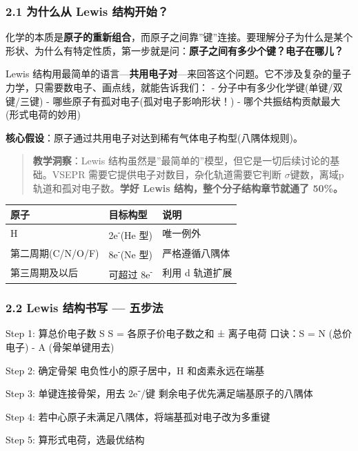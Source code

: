 \documentclass[a4paper,11pt]{ctexart}
\newenvironment{Shaded}{}{}
\newenvironment{Highlighting}{}{}
\newcommand{\NormalTok}[1]{#1}
\newcounter{none}
\newcommand{\箭}{\ensuremath{\rightarrow}}
\newcommand{\左箭}{\ensuremath{\leftarrow}}
\newcommand{\上箭}{\ensuremath{\uparrow}}
\newcommand{\下箭}{\ensuremath{\downarrow}}
\newcommand{\衡}{\ensuremath{\rightleftharpoons}}
\newcommand{\双箭}{\ensuremath{\leftrightarrow}}
\newcommand{\约等于}{\ensuremath{\approx}}
\newcommand{\小于等于}{\ensuremath{\leq}}
\newcommand{\大于等于}{\ensuremath{\geq}}
\newcommand{\不等于}{\ensuremath{\neq}}
\newcommand{\西格马}{\ensuremath{\sigma}}
\newcommand{\派}{\ensuremath{\pi}}
\begin{document}
\subsubsection{2.1 为什么从 Lewis 结构开始？}\label{ux4e3aux4ec0ux4e48ux4ece-lewis-ux7ed3ux6784ux5f00ux59cb}

化学的本质是\textbf{原子的重新组合}，而原子之间靠''键''连接。要理解分子为什么是某个形状、为什么有特定性质，第一步就是问：\textbf{原子之间有多少个键？电子在哪儿？}

Lewis 结构用最简单的语言---\textbf{共用电子对}---来回答这个问题。它不涉及复杂的量子力学，只需要数电子、画点线，就能告诉我们：
- 分子中有多少化学键(单键/双键/三键)
- 哪些原子有孤对电子(孤对电子影响形状！)
- 哪个共振结构贡献最大(形式电荷的妙用)

\textbf{核心假设}：原子通过共用电子对达到稀有气体电子构型(八隅体规则)。

\begin{quote}
\textbf{教学洞察}：Lewis 结构虽然是''最简单的''模型，但它是一切后续讨论的基础。VSEPR 需要它提供电子对数目，杂化轨道需要它判断 \西格马 键数，离域 p 轨道和孤对电子数。\textbf{学好 Lewis 结构，整个分子结构章节就通了 50\%。}
\end{quote}

{\def\LTcaptype{none} %
\begin{longtable}[]{@{}lll@{}}
\toprule\noalign{}
原子 & 目标构型 & 说明 \\
\midrule\noalign{}
\endhead
\bottomrule\noalign{}
\endlastfoot
H & 2e\textsuperscript{-}(He 型) & 唯一例外 \\
第二周期(C/N/O/F) & 8e\textsuperscript{-}(Ne 型) & 严格遵循八隅体 \\
第三周期及以后 & 可超过 8e\textsuperscript{-} & 利用 d 轨道扩展 \\
\end{longtable}
}

\subsubsection{2.2 Lewis 结构书写 --- 五步法}\label{lewis-ux7ed3ux6784ux4e66ux5199-ux4e94ux6b65ux6cd5}

\begin{Shaded}
\begin{Highlighting}[]
\NormalTok{Step 1: 算总价电子数 S}
\NormalTok{  S = 各原子价电子数之和 ± 离子电荷}
\NormalTok{  口诀：S = N (总价电子) {-} A (骨架单键用去)}

\NormalTok{Step 2: 确定骨架}
\NormalTok{  电负性小的原子居中，H 和卤素永远在端基}

\NormalTok{Step 3: 单键连接骨架，用去 2e⁻/键}
\NormalTok{  剩余电子优先满足端基原子的八隅体}

\NormalTok{Step 4: 若中心原子未满足八隅体，将端基孤对电子改为多重键}

\NormalTok{Step 5: 算形式电荷，选最优结构}
\end{Highlighting}
\end{Shaded}
\end{document}
